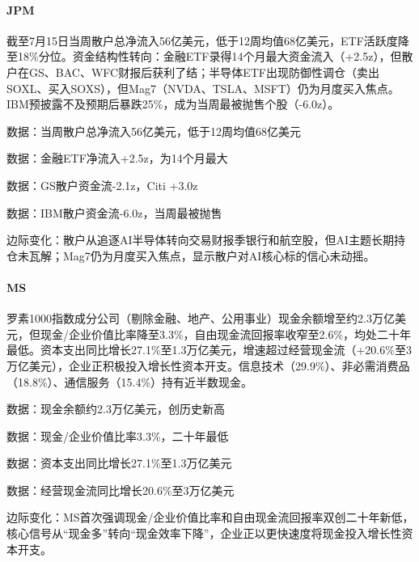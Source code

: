 \documentclass[11pt]{ctexart}
\begin{document}
\paragraph{JPM} 截至7月15日当周散户总净流入56亿美元，低于12周均值68亿美元，ETF活跃度降至18\%分位。资金结构性转向：金融ETF录得14个月最大资金流入（+2.5z），但散户在GS、BAC、WFC财报后获利了结；半导体ETF出现防御性调仓（卖出SOXL、买入SOXS），但Mag7（NVDA、TSLA、MSFT）仍为月度买入焦点。IBM预披露不及预期后暴跌25\%，成为当周最被抛售个股（-6.0z）。
{\small\color{refgray}数据：当周散户总净流入56亿美元，低于12周均值68亿美元\par}
{\small\color{refgray}数据：金融ETF净流入+2.5z，为14个月最大\par}
{\small\color{refgray}数据：GS散户资金流-2.1z，Citi +3.0z\par}
{\small\color{refgray}数据：IBM散户资金流-6.0z，当周最被抛售\par}
{\small\color{refgray}边际变化：散户从追逐AI半导体转向交易财报季银行和航空股，但AI主题长期持仓未瓦解；Mag7仍为月度买入焦点，显示散户对AI核心标的信心未动摇。\par}
\paragraph{MS} 罗素1000指数成分公司（剔除金融、地产、公用事业）现金余额增至约2.3万亿美元，但现金/企业价值比率降至3.3\%，自由现金流回报率收窄至2.6\%，均处二十年最低。资本支出同比增长27.1\%至1.3万亿美元，增速超过经营现金流（+20.6\%至3万亿美元），企业正积极投入增长性资本开支。信息技术（29.9\%）、非必需消费品（18.8\%）、通信服务（15.4\%）持有近半数现金。
{\small\color{refgray}数据：现金余额约2.3万亿美元，创历史新高\par}
{\small\color{refgray}数据：现金/企业价值比率3.3\%，二十年最低\par}
{\small\color{refgray}数据：资本支出同比增长27.1\%至1.3万亿美元\par}
{\small\color{refgray}数据：经营现金流同比增长20.6\%至3万亿美元\par}
{\small\color{refgray}边际变化：MS首次强调现金/企业价值比率和自由现金流回报率双创二十年新低，核心信号从“现金多”转向“现金效率下降”，企业正以更快速度将现金投入增长性资本开支。\par}
\end{document}
